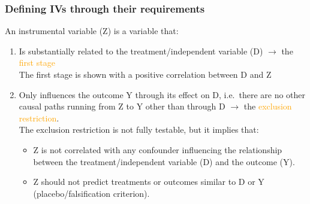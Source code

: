 \documentclass[12pt,english,dvipsnames,aspectratio=169,handout]{beamer}\usepackage[]{graphicx}\usepackage[]{xcolor}
\begin{document}
\begin{frame}
  \frametitle{Defining IVs through their requirements}
  An instrumental variable (Z) is a variable that:
  \begin{enumerate} 
		\item Is substantially related to the treatment/independent variable (D) $\rightarrow$ the \textcolor{orange}{first stage}\\
		
		\scriptsize The first stage is shown with a positive correlation between D and Z \normalsize
		
		\item Only influences the outcome Y through its effect on D, i.e.\ there are no other causal paths running from Z to Y other than through D $\rightarrow$ the \textcolor{orange}{exclusion restriction}. \\
	  	
	  	\scriptsize The exclusion restriction is not fully testable, but it implies that:
		  \begin{itemize} \scriptsize
		    \item Z is not correlated with any confounder influencing the relationship between the treatment/independent variable (D) and the outcome (Y).
		    \item Z should not predict treatments or outcomes similar to D or Y (placebo/falsification criterion).
	    \end {itemize}
	\end {enumerate}
\end{frame}
\end{document}
